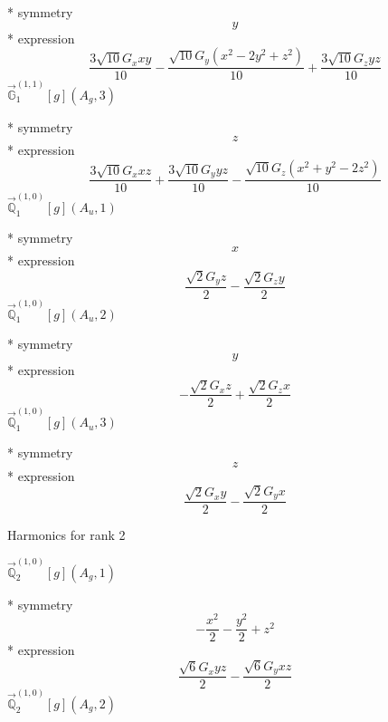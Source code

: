 \documentclass[fleqn,8pt]{jsarticle}
\begin{document}
\noindent\quad ** symmetry
\begin{dmath*}
y
\end{dmath*}
\noindent\quad ** expression
\begin{dmath*}
\frac{3 \sqrt{10} G_{x} x y}{10} - \frac{\sqrt{10} G_{y} \left(x^{2} - 2 y^{2} + z^{2}\right)}{10} + \frac{3 \sqrt{10} G_{z} y z}{10}
\end{dmath*}
\noindent\quad $\vec{\mathbb{G}}_{1}^{(1,1)}[g](A_{g},3)$

\noindent\quad ** symmetry
\begin{dmath*}
z
\end{dmath*}
\noindent\quad ** expression
\begin{dmath*}
\frac{3 \sqrt{10} G_{x} x z}{10} + \frac{3 \sqrt{10} G_{y} y z}{10} - \frac{\sqrt{10} G_{z} \left(x^{2} + y^{2} - 2 z^{2}\right)}{10}
\end{dmath*}
\noindent\quad $\vec{\mathbb{Q}}_{1}^{(1,0)}[g](A_{u},1)$

\noindent\quad ** symmetry
\begin{dmath*}
x
\end{dmath*}
\noindent\quad ** expression
\begin{dmath*}
\frac{\sqrt{2} G_{y} z}{2} - \frac{\sqrt{2} G_{z} y}{2}
\end{dmath*}
\noindent\quad $\vec{\mathbb{Q}}_{1}^{(1,0)}[g](A_{u},2)$

\noindent\quad ** symmetry
\begin{dmath*}
y
\end{dmath*}
\noindent\quad ** expression
\begin{dmath*}
- \frac{\sqrt{2} G_{x} z}{2} + \frac{\sqrt{2} G_{z} x}{2}
\end{dmath*}
\noindent\quad $\vec{\mathbb{Q}}_{1}^{(1,0)}[g](A_{u},3)$

\noindent\quad ** symmetry
\begin{dmath*}
z
\end{dmath*}
\noindent\quad ** expression
\begin{dmath*}
\frac{\sqrt{2} G_{x} y}{2} - \frac{\sqrt{2} G_{y} x}{2}
\end{dmath*}

\noindent * Harmonics for rank 2

\noindent\quad $\vec{\mathbb{Q}}_{2}^{(1,0)}[g](A_{g},1)$

\noindent\quad ** symmetry
\begin{dmath*}
- \frac{x^{2}}{2} - \frac{y^{2}}{2} + z^{2}
\end{dmath*}
\noindent\quad ** expression
\begin{dmath*}
\frac{\sqrt{6} G_{x} y z}{2} - \frac{\sqrt{6} G_{y} x z}{2}
\end{dmath*}
\noindent\quad $\vec{\mathbb{Q}}_{2}^{(1,0)}[g](A_{g},2)$
\end{document}
